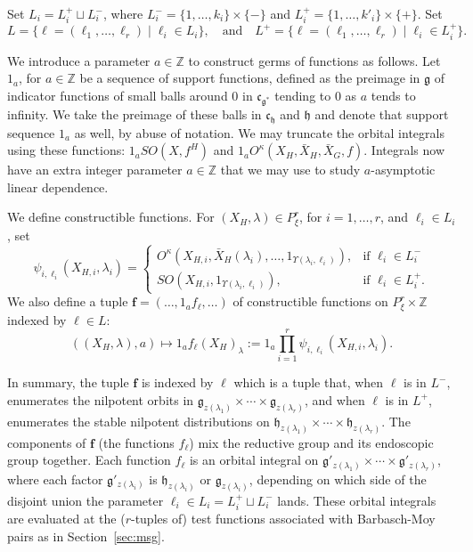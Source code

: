 \documentclass[12pt]{amsart}
\newcommand{\ring}[1]{{\mathbb #1}}
\def\Y{\Upsilon}
\def\bf{\mathbf f}
\newcommand{\fg}{\mathfrak{g}}
\newcommand{\fc}{\mathfrak{c}}
\newcommand{\fh}{\mathfrak{h}}
\theoremstyle{plain}
\theoremstyle{definition}
\begin{document}
Set
$L_i = L^+_i\sqcup L^-_i$, where $L^-_i =
\{1,\ldots,k_i\}\times\{-\}$ and $L^+_i =
\{1,\ldots,k'_i\}\times\{+\}$.
Set
\[
L = \{\ell = (\ell_1,\ldots,\ell_r)\mid \ell_i\in L_i\},\quad\text{and}\quad
L^+ = \{\ell = (\ell_1,\ldots,\ell_r)\mid \ell_i\in L^+_i\}.
\]

We introduce a parameter $a\in\ring{Z}$ to construct germs of
functions as follows.  Let $1_a$, for $a\in\ring{Z}$ be a sequence of
support functions, defined as the preimage in $\fg$ of indicator
functions of small balls around $0$ in $\fc_{\fg^*}$ tending to $0$ as
$a$ tends to infinity.  We take the preimage of these balls in
$\fc_{\fh}$ and $\fh$ and denote that support sequence $1_a$ as well,
by abuse of notation.  We may truncate the orbital integrals using
these functions: $1_a SO(X,f^H)$ and $1_a O^\kappa(X_H,\bar
X_H,\bar X_G,f)$.  Integrals now have an extra integer parameter
$a\in\ring{Z}$ that we may use to study $a$-asymptotic linear
dependence.  

We define constructible functions.  For $(X_H,\lambda)\in
P^r_\xi$,  for $i=1,\ldots,r$, and $\ell_i\in L_i$,
set
\begin{equation}\label{eqn:psi}
\psi_{i,\ell_i}(X_{H,i},\lambda_i) = 
\begin{cases}   
  O^\kappa(X_{H,i},\bar X_H(\lambda_i),\ldots,1_{\Y(\lambda_i,\ell_i)}),
   & \text{if } \ell_i\in L^-_i \\
  SO(X_{H,i},1_{\Y(\lambda_i,\ell_i)}),
   & \text{if } \ell_i\in L^+_i.
\end{cases}
\end{equation}
We also define a tuple $\bf=(\ldots,1_a f_\ell,\ldots)$ of constructible
functions on $P^r_\xi\times\ring{Z}$ indexed by $\ell\in L$:
\[
((X_H,\lambda),a)\mapsto 1_a f_\ell(X_H)_\lambda 
:= 1_a \prod_{i=1}^r \psi_{i,\ell_i}(X_{H,i},\lambda_i).
\]


In summary, the tuple $\bf$ is indexed by $\ell$ which is a tuple
that, when $\ell$ is in $L^-$, enumerates the nilpotent orbits in
$\fg_{z(\lambda_1)}\times \cdots\times \fg_{z(\lambda_r)}$, and when
$\ell$ is in $L^+$, enumerates the stable nilpotent distributions on
$\fh_{z(\lambda_1)}\times \cdots\times \fh_{z(\lambda_r)}$.  The
components of $\bf$ (the functions $f_\ell$) mix the reductive group
and its endoscopic group together.  Each function $f_\ell$ is an
orbital integral on $\fg'_{z(\lambda_1)}\times \cdots\times
\fg'_{z(\lambda_r)}$, where each factor $\fg'_{z(\lambda_i)}$ is
$\fh_{z(\lambda_i)}$ or $\fg_{z(\lambda_i)}$, depending on which side
of the disjoint union the parameter $\ell_i\in L_i = L^+_i\sqcup
L^-_i$ lands.  These orbital integrals are evaluated at the
($r$-tuples of) test functions associated with Barbasch-Moy pairs as
in Section~\ref{sec:msg}. 
\end{document}
